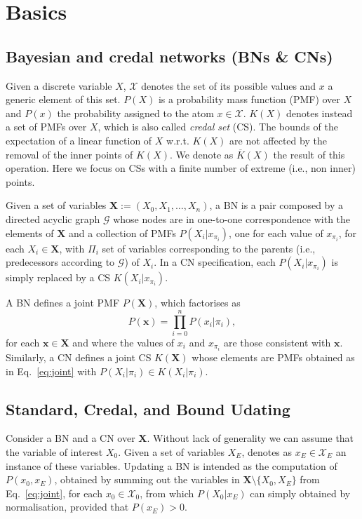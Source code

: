 \section{Basics}\label{sec:basics}
\subsection{Bayesian and credal networks (BNs \& CNs)}
Given a discrete variable $X$, $\mathcal{X}$ denotes the set of its possible values and $x$ a generic element of this set. $P(X)$ is a probability mass function (PMF) over $X$ and $P(x)$ the probability assigned to the atom $x\in\mathcal{X}$. $K(X)$ denotes instead a set of PMFs over $X$, which is also called \emph{credal set} (CS). The bounds of the expectation of a linear function of $X$ w.r.t. $K(X)$ are not affected by the removal of the inner points of $K(X)$. We denote as $\overline{K}(X)$ the result of this operation. Here we focus on CSs with a finite number of extreme (i.e., non inner) points.


Given a set of variables $\bm{X}:=(X_0,X_1,\ldots,X_n)$, a BN is a pair composed by a directed acyclic graph $\mathcal{G}$ whose nodes are in one-to-one correspondence with the elements of $\bm{X}$ and a collection of PMFs $P(X_i|x_{\pi_i})$, one for each value of $x_{\pi_i}$, for each $X_i \in \bm{X}$, with $\Pi_i$ set of variables corresponding to the parents (i.e., predecessors according to $\mathcal{G}$) of $X_i$. In a CN specification, each $P(X_i|x_{\pi_i})$ is simply replaced by a CS $K(X_i|x_{\pi_i})$.

A BN defines a joint PMF $P(\bm{X})$, which factorises as \begin{equation}\label{eq:joint}
P(\bm{x}) = \prod_{i=0}^n P(x_i|\pi_i),
\end{equation}
for each $\bm{x}\in\mathcal{\bm{X}}$ and where the values of $x_i$ and $x_{\pi_i}$ are those consistent with $\bm{x}$. Similarly, a CN defines a joint CS $K(\bm{X})$ whose elements are PMFs obtained as in Eq.~\ref{eq:joint} with $P(X_i|\pi_i)\in K(X_i|\pi_i)$. 

\subsection{Standard, Credal, and Bound Udating}

Consider a BN and a CN over $\bm{X}$. Without lack of generality we can assume that the variable of interest $X_0$. Given a set of variables $X_E$, denotes as $x_E\in\mathcal{X}_E$ an instance of these variables. Updating a BN is intended as the computation of $P(x_0,x_E)$, obtained by summing out the variables in $\bm{X}\setminus \{X_0,X_E\}$ from Eq.~\ref{eq:joint}, for each $x_0\in\mathcal{X}_0$, from which $P(X_0|x_E)$ can simply obtained by normalisation, provided that $P(x_E)>0$.

